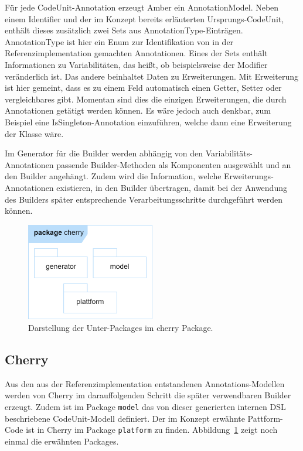 \documentclass[12pt,oneside,a4paper,parskip]{scrbook}
\begin{document}
Für jede CodeUnit-Annotation erzeugt Amber ein AnnotationModel. Neben einem Identifier und der im Konzept bereits erläuterten Ursprungs-CodeUnit, enthält dieses zusätzlich zwei Sets aus AnnotationType-Einträgen. AnnotationType ist hier ein Enum zur Identifikation von in der Referenzimplementation gemachten Annotationen. Eines der Sets enthält Informationen zu Variabilitäten, das heißt, ob beispielsweise der Modifier veränderlich ist. Das andere beinhaltet Daten zu Erweiterungen. Mit Erweiterung ist hier gemeint, dass es zu einem Feld automatisch einen Getter, Setter oder vergleichbares gibt. Momentan sind dies die einzigen Erweiterungen, die durch Annotationen getätigt werden können. Es wäre jedoch auch denkbar, zum Beispiel eine IsSingleton-Annotation einzuführen, welche dann eine Erweiterung der Klasse wäre.

Im Generator für die Builder werden abhängig von den Variabilitäts-Annotationen passende Builder-Methoden als Komponenten ausgewählt und an den Builder angehängt. Zudem wird die Information, welche Erweiterungs-Annotationen existieren, in den Builder übertragen, damit bei der Anwendung des Builders später entsprechende Verarbeitungsschritte durchgeführt werden können.

\begin{figure}[htbp]
\centering
\includegraphics[width=0.5\textwidth]{bilder/cherry}
\caption{Darstellung der Unter-Packages im cherry Package.}
\label{fig:cherryPackages}
\end{figure}

\subsection{Cherry}

Aus den aus der Referenzimplementation entstandenen Annotations-Modellen werden von Cherry im darauffolgenden Schritt die später verwendbaren Builder erzeugt. Zudem ist im Package \texttt{model} das von dieser generierten internen DSL beschriebene CodeUnit-Modell definiert. Der im Konzept erwähnte Pattform-Code ist in Cherry im Package \texttt{platform} zu finden. Abbildung~\ref{fig:cherryPackages} zeigt noch einmal die erwähnten Packages.
\end{document}
